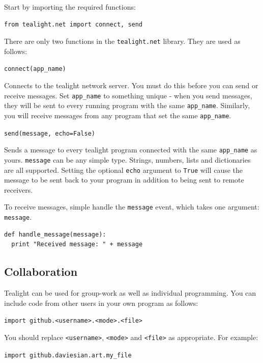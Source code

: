 \documentclass[12pt,a4paper,twoside]{article}
\renewcommand{\_}{\texttt{\symbol{95}}}
\begin{document}
Start by importing the required functions:

\begin{verbatim}
from tealight.net import connect, send
\end{verbatim}

There are only two functions in the \verb^tealight.net^ library. They are used as follows:

\begin{bulletlist}
\item \verb^connect(app_name)^

	Connects to the tealight network server. You must do this before you can send or receive messages. Set \verb^app_name^ to something unique - when you send messages, they will be sent to every running program with the same \verb^app_name^. Similarly, you will receive messages from any program that set the same \verb^app_name^.

\item \verb^send(message, echo=False)^

	Sends a message to every tealight program connected with the same \verb^app_name^ as yours. \verb^message^ can be any simple type. Strings, numbers, lists and dictionaries are all supported. Setting the optional \verb^echo^ argument to \verb^True^ will cause the message to be sent back to your program in addition to being sent to remote receivers.
\end{bulletlist}

To receive messages, simple handle the \verb^message^ event, which takes one argument: \verb^message^.

\begin{verbatim}
def handle_message(message):
  print "Received message: " + message
\end{verbatim}

\subsection{Collaboration}

Tealight can be used for group-work as well as individual programming. You can include code from other users in your own program as follows:

\verb^import github.<username>.<mode>.<file>^

You should replace \verb^<username>^, \verb^<mode>^ and \verb^<file>^ as appropriate. For example:

\verb^import github.daviesian.art.my_file^
\end{document}
